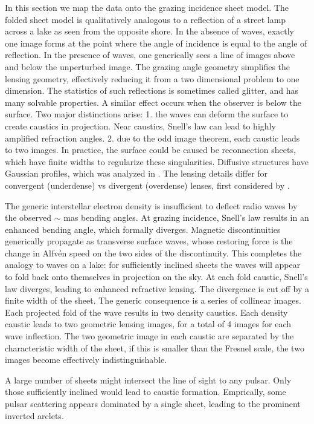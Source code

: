 \documentclass[useAMS,usenatbib]{mn2e}
\begin{document}
In this section we map the data onto the grazing incidence sheet
model.  The folded sheet model is qualitatively analogous to a
reflection of a street lamp across a lake as seen from the opposite
shore.  In the absence of waves, exactly one image forms at the point
where the angle of incidence is equal to the angle of reflection.  In
the presence of waves, one generically sees a line of images above and
below the unperturbed image.  The grazing angle geometry simplifies
the lensing geometry, effectively reducing it from a two dimensional problem to
one dimension.  The statistics of such reflections is sometimes called
glitter, and has many solvable
properties\citep{LonguetHiggins1960}. 
A similar effect occurs when the
observer is below the surface.  Two major distinctions arise: 1. the
waves can deform the surface to create caustics in projection. Near
caustics, Snell's law can lead to highly amplified refraction
angles. 2. due to the odd image theorem, each caustic leads to two
images.  In practice, the surface could be caused be reconnection
sheets\citep{2015MNRAS.450.3201B}, which have finite widths to
regularize these singularities. Diffusive structures have Gaussian
profiles, which was analyzed in \citet{2012MNRAS.421L.132P}.  The
lensing details differ for convergent (underdense) vs divergent
(overdense) lenses, first considered by \citet{1998ApJ...496..253C}.

The generic interstellar electron density is insufficient to deflect
radio waves by the observed $\sim$ mas bending angles. At grazing
incidence, Snell's law results in an enhanced bending angle, which
formally diverges.  Magnetic discontinuities generically propagate
as transverse surface waves, whose restoring force is the change in Alfv\'en
speed on the two sides of the discontinuity. This completes the
analogy to waves on a lake: for sufficiently inclined sheets the waves
will appear to fold back onto themselves in projection on the sky.  At
each fold caustic, Snell's law diverges, leading to enhanced
refractive lensing.  The divergence is cut off by a finite width of
the sheet.  The generic consequence is a series of collinear images.
Each projected fold of the wave results in two density caustics.  Each density
caustic leads to two geometric lensing images, for a total of 4 images
for each wave inflection.  The two geometric image in each caustic are
separated by the characteristic width of the sheet, if this is smaller
than the Fresnel scale, the two images become effectively
indistinguishable. 

A large number of sheets might intersect the line of sight to any
pulsar. Only those sufficiently inclined would lead to caustic
formation. Emprically, some pulsar scattering appears dominated by a
single sheet, leading to the prominent inverted
arclets\citep{2001ApJ...549L..97S}.
\end{document}
